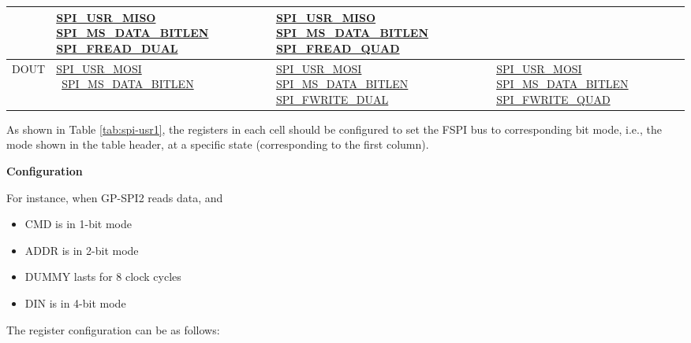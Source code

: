 \documentclass[main\_\_EN.tex]{subfiles}
\begin{document}
\begin{landscape}
\begin{longtable}[c]{ |L{1.3cm}|L{5.2cm}|L{5.2cm}|L{5.2cm}| }
     &\hyperref[fielddesc:SPIUSRMISO]{SPI\_USR\_MISO}  
     \hyperref[fielddesc:SPIMSDATABITLEN]{SPI\_MS\_DATA\_BITLEN}  
    \hyperref[fielddesc:SPIFREADDUAL]{SPI\_FREAD\_DUAL} 
     &\hyperref[fielddesc:SPIUSRMISO]{SPI\_USR\_MISO}  
     \hyperref[fielddesc:SPIMSDATABITLEN]{SPI\_MS\_DATA\_BITLEN}  
    \hyperref[fielddesc:SPIFREADQUAD]{SPI\_FREAD\_QUAD}\\
     \hline
DOUT &\hyperref[fielddesc:SPIUSRMOSI]{SPI\_USR\_MOSI}       \
      \hyperref[fielddesc:SPIMSDATABITLEN]{SPI\_MS\_DATA\_BITLEN} 
     &\hyperref[fielddesc:SPIUSRMOSI]{SPI\_USR\_MOSI}       
     \hyperref[fielddesc:SPIMSDATABITLEN]{SPI\_MS\_DATA\_BITLEN}      \hyperref[fielddesc:SPIFWRITEDUAL]{SPI\_FWRITE\_DUAL} & 
    \hyperref[fielddesc:SPIUSRMOSI]{SPI\_USR\_MOSI}       
     \hyperref[fielddesc:SPIMSDATABITLEN]{SPI\_MS\_DATA\_BITLEN}      \hyperref[fielddesc:SPIFWRITEQUAD]{SPI\_FWRITE\_QUAD} \\
     \hline
\end{longtable}
\end{landscape}

As shown in Table \ref{tab:spi-usr1}, the registers in each cell should be configured to set the FSPI bus to corresponding bit mode, i.e., the mode shown in the table header, at a specific state (corresponding to the first column). 

\textbf{Configuration}

For instance, when GP-SPI2 reads data, and 
\begin{itemize}
    \item CMD is in 1-bit mode
    \item ADDR is in 2-bit mode
    \item DUMMY lasts for 8 clock cycles
    \item DIN is in 4-bit mode
\end{itemize}
The register configuration can be as follows:
\end{document}
